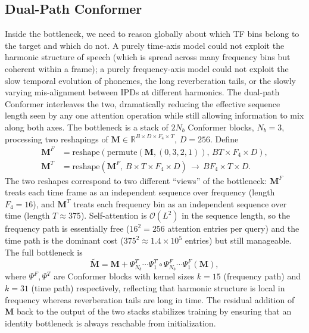 \documentclass[journal,10pt]{IEEEtran}
\newcommand{\R}{\mathbb{R}}
\newcommand{\bM}{\mathbf{M}}
\begin{document}



\subsection{Dual-Path Conformer}
\label{sec:dpconf}
Inside the bottleneck, we need to reason globally about which TF bins belong to the target and which do not. A purely time-axis model could not exploit the harmonic structure of speech (which is spread across many frequency bins but coherent within a frame); a purely frequency-axis model could not exploit the slow temporal evolution of phonemes, the long reverberation tails, or the slowly varying mis-alignment between IPDs at different harmonics. The dual-path Conformer interleaves the two, dramatically reducing the effective sequence length seen by any one attention operation while still allowing information to mix along both axes. The bottleneck is a stack of \(2N_b\) Conformer blocks, \(N_b=3\), processing two reshapings of \(\bM\in\R^{B\times D\times F_4\times T}\), \(D=256\). Define
\begin{align}
\bM^{F}&=\mathrm{reshape}(\mathrm{permute}(\bM,(0,3,2,1)),\,BT\!\times\!F_4\!\times\!D),\\
\bM^{T}&=\mathrm{reshape}(\bM^{F},\,B\!\times\!T\!\times\!F_4\!\times\!D)\,\to\,BF_4\!\times\!T\!\times\!D.
\end{align}
The two reshapes correspond to two different ``views'' of the bottleneck: \(\bM^F\) treats each time frame as an independent sequence over frequency (length \(F_4=16\)), and \(\bM^T\) treats each frequency bin as an independent sequence over time (length \(T\approx 375\)). Self-attention is \(\mathcal{O}(L^2)\) in the sequence length, so the frequency path is essentially free (\(16^2=256\) attention entries per query) and the time path is the dominant cost (\(375^2\!\approx\!1.4\!\times\!10^5\) entries) but still manageable. The full bottleneck is
\begin{equation}
\widetilde{\bM}=\bM+\Psi^{T}_{N_b}\!\cdots\!\Psi^{T}_1\!\circ\!\Psi^{F}_{N_b}\!\cdots\!\Psi^{F}_1(\bM),
\label{eq:dp}
\end{equation}
where \(\Psi^{F},\Psi^{T}\) are Conformer blocks with kernel sizes \(k=15\) (frequency path) and \(k=31\) (time path) respectively, reflecting that harmonic structure is local in frequency whereas reverberation tails are long in time. The residual addition of \(\bM\) back to the output of the two stacks stabilizes training by ensuring that an identity bottleneck is always reachable from initialization.
\end{document}
